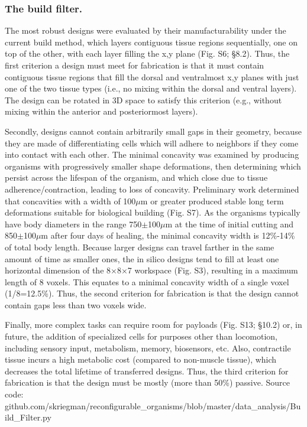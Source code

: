 \subsubsection*{The build filter.}

The most robust designs were evaluated by their manufacturability under the current build method, which layers contiguous tissue regions sequentially, one on top of the other, with each layer filling the x,y plane (Fig. S6; §8.2). Thus, the first criterion a design must meet for fabrication is that it must contain contiguous tissue regions that fill the dorsal and ventralmost x,y planes with just one of the two tissue types (i.e., no mixing within the dorsal and ventral layers). The design can be rotated in 3D space to satisfy this criterion (e.g., without mixing within the anterior and posteriormost layers). 

Secondly, designs cannot contain arbitrarily small gaps in their geometry, because they are made of differentiating cells which will adhere to neighbors if they come into contact with each other. The minimal concavity was examined by producing organisms with progressively smaller shape deformations, then determining which persist across the lifespan of the organism, and which close due to tissue adherence/contraction, leading to loss of concavity. Preliminary work determined that concavities with a width of 100{$\mu$}m or greater produced stable long term deformations suitable for biological building (Fig. S7). As the organisms typically have body diameters in the range 750{$\pm$}100{$\mu$}m at the time of initial cutting and 850{$\pm$}100{$\mu$}m after four days of healing, the minimal concavity width is 12\%-14\% of total body length. 
Because larger designs can travel farther in the same amount of time as smaller ones, the in silico designs tend to fill at least one horizontal dimension of the 8{$\times$}8{$\times$}7 workspace (Fig. S3), resulting in a maximum length of 8 voxels. This equates to a minimal concavity width of a single voxel (1/8=12.5\%). Thus, the second criterion for fabrication is that the design cannot contain gaps less than two voxels wide.

Finally, more complex tasks can require room for payloads (Fig. S13; §10.2) or, in future, the addition of specialized cells for purposes other than locomotion, including sensory input, metabolism, memory, biosensors, etc. Also, contractile tissue incurs a high metabolic cost (compared to non-muscle tissue), which decreases the total lifetime of transferred designs. Thus, the third criterion for fabrication is that the design must be mostly (more than 50\%) passive.
Source code: github.com/skriegman/reconfigurable\_organisms/blob/master/data\_analysis/Build\_Filter.py



